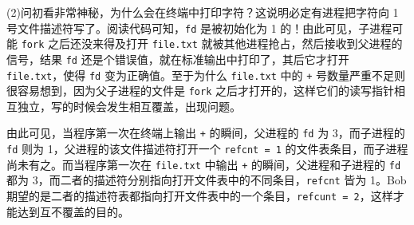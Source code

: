 \begin{problems}
        (2)问初看非常神秘，为什么会在终端中打印字符？这说明必定有进程把字符向 1 号文件描述符写了。阅读代码可知，\verb|fd| 是被初始化为 1 的！由此可见，子进程可能 \verb|fork| 之后还没来得及打开 \verb|file.txt| 就被其他进程抢占，然后接收到父进程的信号，结果 \verb|fd| 还是个错误值，就在标准输出中打印了，其后它才打开 \verb|file.txt|，使得 \verb|fd| 变为正确值。至于为什么 \verb|file.txt| 中的 \verb|+| 号数量严重不足则很容易想到，因为父子进程的文件是 \verb|fork| 之后才打开的，这样它们的读写指针相互独立，写的时候会发生相互覆盖，出现问题。

        由此可见，当程序第一次在终端上输出 \verb|+| 的瞬间，父进程的 \verb|fd| 为 3，而子进程的 \verb|fd| 则为 1，父进程的该文件描述符打开一个 \verb|refcnt = 1| 的文件表条目，而子进程尚未有之。而当程序第一次在 \verb|file.txt| 中输出 \verb|+| 的瞬间，父进程和子进程的 \verb|fd| 都为 3，而二者的描述符分别指向打开文件表中的不同条目，\verb|refcnt| 皆为 1。Bob 期望的是二者的描述符表都指向打开文件表中的一个条目，\verb|refcunt = 2|，这样才能达到互不覆盖的目的。


\end{problems}
